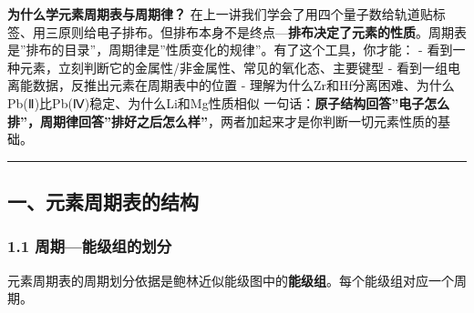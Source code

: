 \textbf{为什么学元素周期表与周期律？} 在上一讲我们学会了用四个量子数给轨道贴标签、用三原则给电子排布。但排布本身不是终点---\textbf{排布决定了元素的性质}。周期表是''排布的目录''，周期律是''性质变化的规律''。有了这个工具，你才能：
- 看到一种元素，立刻判断它的金属性/非金属性、常见的氧化态、主要键型
- 看到一组电离能数据，反推出元素在周期表中的位置
- 理解为什么Zr和Hf分离困难、为什么Pb(Ⅱ)比Pb(Ⅳ)稳定、为什么Li和Mg性质相似
一句话：\textbf{原子结构回答''电子怎么排''，周期律回答''排好之后怎么样''}，两者加起来才是你判断一切元素性质的基础。

\begin{center}\rule{0.5\linewidth}{0.5pt}\end{center}

\subsection{一、元素周期表的结构}\label{ux4e00ux5143ux7d20ux5468ux671fux8868ux7684ux7ed3ux6784}

\subsubsection{1.1 周期---能级组的划分}\label{ux5468ux671fux80fdux7ea7ux7ec4ux7684ux5212ux5206}

元素周期表的周期划分依据是鲍林近似能级图中的\textbf{能级组}。每个能级组对应一个周期。

